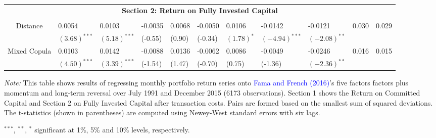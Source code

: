 \begin{table}[!ht]
\begin{threeparttable}[H]
\begin{tabularx}{\textwidth}{@{\extracolsep{\fill}} lllllllllll@{}}
				&       &       &       &       &       &       &       &       &       &       \\
				\midrule
				\multicolumn{11}{c}{\textbf{Section 2: Return on Fully Invested Capital}} \\
				&       &       &       &       &       &       &       &       &       &    \\
				\multicolumn{1}{c}{Distance} & 0.0054 & 0.0103 & -0.0035 & 0.0068 & -0.0050 & 0.0106 & -0.0142 & -0.0121 & 0.030 & 0.029 \\
				\multicolumn{1}{c}{} & $(3.68)^{***}$ & $(5.18)^{***}$ & (-0.55) & (0.90) & (-0.34) & $(1.78)^{*}$ & $(-4.94)^{***}$ & $(-2.08)^{**}$ & & \\
				\multicolumn{1}{c}{Mixed Copula} & 0.0103 & 0.0142 & -0.0088 & 0.0136 & -0.0062 & 0.0086 & -0.0049 & -0.0246 & 0.016 & 0.015 \\
				\multicolumn{1}{c}{} & $(4.50)^{***}$ & $(3.39)^{***}$ & (-1.54) & (1.47) & (-0.70) & (0.75) & (-1.36) & $(-2.36)^{**}$ & & \\
				\bottomrule
			\end{tabularx}
			\begin{tablenotes}
				\item \textit{Note:} \tiny  This table shows results of regressing monthly portfolio return series onto \textcolor{blue}{Fama and French} \textcolor{blue}{(2016)}'s five factors factors plus momentum and long-term reversal over July 1991 and December 2015 (6173 observations). Section 1 shows the Return on Committed Capital and Section 2 on Fully Invested Capital after transaction costs. Pairs are formed based on the smallest sum of squared deviations. The t-statistics (shown in parentheses) are computed using Newey-West standard errors with six lags.
				\item \footnotesize $^{\ast\ast\ast}$, $^{\ast\ast}$, $^{\ast}$  significant at 1\%, 5\% and 10\% levels, respectively.
			\end{tablenotes}
		\end{threeparttable}%
		\label{tab:table104}%
	\end{table}%

\vspace{0.6cm}

